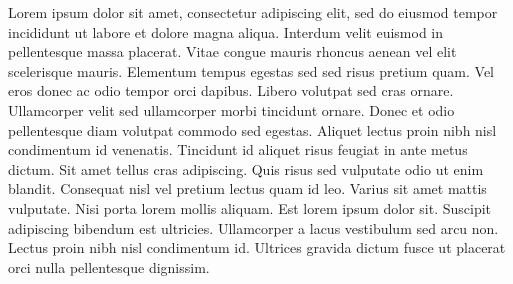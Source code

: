 \documentclass[11pt, a4paper]{awesome-cv}
\begin{document}
\begin{cvletter}
    Lorem ipsum dolor sit amet, consectetur adipiscing elit, sed do eiusmod tempor incididunt
    ut labore et dolore magna aliqua. Interdum velit euismod in pellentesque massa placerat.
    Vitae congue mauris rhoncus aenean vel elit scelerisque mauris. Elementum tempus egestas
    sed sed risus pretium quam. Vel eros donec ac odio tempor orci dapibus. Libero volutpat
    sed cras ornare. Ullamcorper velit sed ullamcorper morbi tincidunt ornare. Donec et odio
    pellentesque diam volutpat commodo sed egestas. Aliquet lectus proin nibh nisl condimentum
    id venenatis. Tincidunt id aliquet risus feugiat in ante metus dictum. Sit amet tellus cras
    adipiscing. Quis risus sed vulputate odio ut enim blandit. Consequat nisl vel pretium lectus
    quam id leo. Varius sit amet mattis vulputate. Nisi porta lorem mollis aliquam. Est lorem
    ipsum dolor sit. Suscipit adipiscing bibendum est ultricies. Ullamcorper a lacus vestibulum
    sed arcu non. Lectus proin nibh nisl condimentum id. Ultrices gravida dictum fusce ut placerat
    orci nulla pellentesque dignissim.
\end{cvletter}


\makeletterclosing
\end{document}
